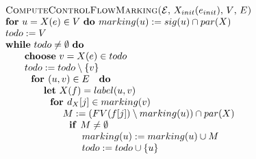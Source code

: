 \begin{equation*}
\begin{tabular}{l}
\textsc{ComputeControlFlowMarking(}$\mathcal{E}$, $X_{init}(e_{init})$, $V$, 
$E$\textsc{)} \\ 
\textbf{for} $u=X(e)\in V$ \textbf{do }$marking(u):=sig(u)\cap par(X)$ \\ 
$todo:=V$ \\ 
\textbf{while} $todo\neq \emptyset $ \textbf{do} \\ 
$\qquad $\textbf{choose} $v=X(e)\in todo$ \\ 
$\qquad todo:=todo\setminus \{v\}$ \\ 
$\qquad \text{\textbf{for }}(u,v)\in E\text{ \textbf{do}}$ \\ 
$\qquad \qquad $\textbf{let} $X(f)=label(u,v)$ \\ 
$\qquad \qquad \text{\textbf{for }}d_{X}[j]\in marking(v)$ \\ 
$\qquad \qquad \qquad M:=(FV(f[j])\setminus marking(u))\cap par(X)$ \\ 
$\qquad \qquad \qquad \text{\textbf{if }}M\neq \emptyset $ \\ 
$\qquad \qquad \qquad \qquad marking(u):=marking(u)\cup M$ \\ 
$\qquad \qquad \qquad \qquad todo:=todo\cup \{u\}$%
\end{tabular}%
\end{equation*}

